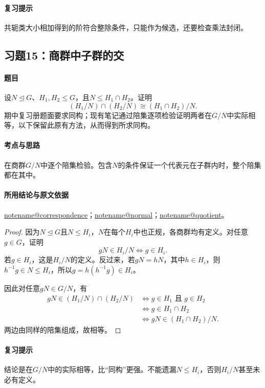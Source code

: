 \documentclass[UTF8,a4paper,11pt,fontset=windows]{ctexart}
\makeatletter
\newcommand{\noteref}[1]{\hyperref[note:#1]{\csname notename@#1\endcsname}}
\newcommand{\exref}[2]{\hyperref[ex:#1:#2]{第#1章习题#2}}
\makeatother
\begin{document}
\paragraph{复习提示}
共轭类大小相加得到的阶符合整除条件，只能作为候选，还要检查乘法封闭。


\subsection{习题15：\texorpdfstring{商群中子群的交}{商群中子群的交}}
\label{ex:2:15}

\paragraph{题目}
设$N\trianglelefteq G$、$H_1,H_2\le G$，且$N\le H_1\cap H_2$。证明
\[
(H_1/N)\cap(H_2/N)\cong(H_1\cap H_2)/N.
\]
期中复习册题面要求同构；现有笔记通过陪集逐项检验证明两者在$G/N$中实际相等，以下保留此原有方法，从而得到所求同构。

\paragraph{考点与思路}
在商群$G/N$中逐个陪集检验。包含$N$的条件保证一个代表元在子群内时，整个陪集都在其中。

\paragraph{所用结论与原文依据}
\noteref{correspondence}；\noteref{normal}；\noteref{quotient}。


\begin{proof}
因为$N\trianglelefteq G$且$N\le H_i$，$N$在每个$H_i$中也正规，各商群均有定义。对任意$g\in G$，证明
\[
gN\in H_i/N\iff g\in H_i.
\]
若$g\in H_i$，这是$H_i/N$的定义。反过来，若$gN=hN$，其中$h\in H_i$，则$h^{-1}g\in N\le H_i$，所以$g=h(h^{-1}g)\in H_i$。

因此对任意$gN\in G/N$，有
\begin{align*}
gN\in(H_1/N)\cap(H_2/N)
&\iff g\in H_1\text{ 且 }g\in H_2\\
&\iff g\in H_1\cap H_2\\
&\iff gN\in(H_1\cap H_2)/N.
\end{align*}
两边由同样的陪集组成，故相等。
\end{proof}

\paragraph{复习提示}
结论是在$G/N$中的实际相等，比“同构”更强。不能遗漏$N\le H_i$，否则$H_i/N$甚至未必有定义。
\end{document}
